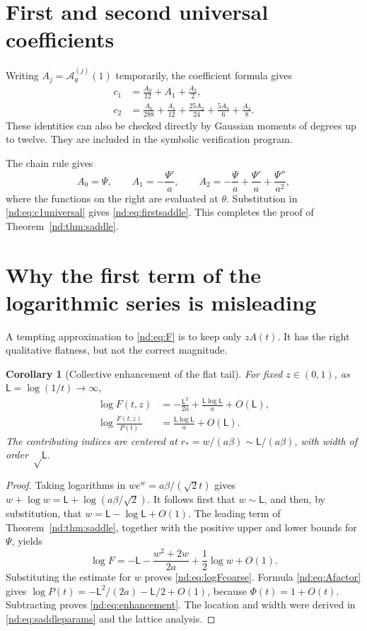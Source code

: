 \documentclass[11pt,a4paper,oneside,openany]{book}
\numberwithin{equation}{chapter}
\newtheorem{corollary}[theorem]{Corollary}
\theoremstyle{definition}
\theoremstyle{remark}
\newcommand{\Lsad}{\mathsf L}
\begin{document}
\section{First and second universal coefficients}
Writing \(A_j=\mathcal A_\theta^{(j)}(1)\) temporarily, the coefficient
formula gives
\begin{align}
 c_1&=\frac{A_0}{12}+A_1+\frac{A_2}{2},
 \label{nd:eq:c1universal}\\
 c_2&=\frac{A_0}{288}+\frac{A_1}{12}
            +\frac{25A_2}{24}+\frac{5A_3}{6}+\frac{A_4}{8}.
 \label{nd:eq:c2universal}
\end{align}
These identities can also be checked directly by Gaussian moments of degrees
up to twelve. They are included in the symbolic verification program.

The chain rule gives
\begin{equation}
 A_0=\Psi,\qquad A_1=-\frac{\Psi'}a,\qquad
 A_2=-\frac\Psi a+\frac{\Psi'}a+\frac{\Psi''}{a^2},
 \label{nd:eq:Aderivatives}
\end{equation}
where the functions on the right are evaluated at \(\theta\). Substitution
in \eqref{nd:eq:c1universal} gives \eqref{nd:eq:firstsaddle}. This completes the
proof of Theorem~\ref{nd:thm:saddle}.

\section{Why the first term of the logarithmic series is misleading}
A tempting approximation to \eqref{nd:eq:F} is to keep only \(zA(t)\). It has
the right qualitative flatness, but not the correct magnitude.

\begin{corollary}[Collective enhancement of the flat tail]
\label{nd:cor:enhancement}
For fixed \(z\in(0,1)\), as \(\Lsad=\log(1/t)\to\infty\),
\begin{align}
 \log F(t,z)&=-\frac{\Lsad^2}{2a}+\frac{\Lsad\log \Lsad}{a}+O(\Lsad),
 \label{nd:eq:logFcoarse}\\
 \log\frac{F(t,z)}{P(t)}&=\frac{\Lsad\log \Lsad}{a}+O(\Lsad).
 \label{nd:eq:enhancement}
\end{align}
The contributing indices are centered at
\(r_*=w/(a\beta)\sim \Lsad/(a\beta)\), with width of order \(\sqrt \Lsad\).
\end{corollary}
\begin{proof}
Taking logarithms in \(we^w=a\beta/(\sqrt2t)\) gives
\(w+\log w=\Lsad+\log(a\beta/\sqrt2)\). It follows first that \(w\sim \Lsad\),
and then, by substitution, that \(w=\Lsad-\log \Lsad+O(1)\).
The leading term of Theorem~\ref{nd:thm:saddle}, together with the positive
upper and lower bounds for \(\Psi\), yields
\[
 \log F=-\Lsad-\frac{w^2+2w}{2a}+\frac12\log w+O(1).
\]
Substituting the estimate for \(w\) proves \eqref{nd:eq:logFcoarse}.
Formula \eqref{nd:eq:Afactor} gives
\(\log P(t)=-\Lsad^2/(2a)-\Lsad/2+O(1)\), because \(\Phi(t)=1+O(t)\).
Subtracting proves \eqref{nd:eq:enhancement}. The location and width were derived
in \eqref{nd:eq:saddleparams} and the lattice analysis.
\end{proof}
\end{document}
